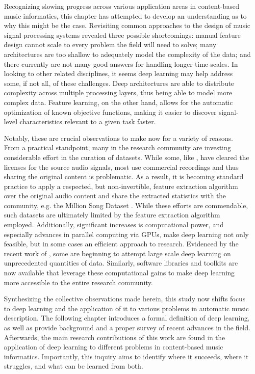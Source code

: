 Recognizing slowing progress across various application areas in content-based music informatics, this chapter has attempted to develop an understanding as to why this might be the case.
Revisiting common approaches to the design of music signal processing systems revealed three possible shortcomings:
manual feature design cannot scale to every problem the field will need to solve;
many architectures are too shallow to adequately model the complexity of the data;
and there currently are not many good answers for handling longer time-scales.
In looking to other related disciplines, it seems deep learning may help address some, if not all, of these challenges.
Deep architectures are able to distribute complexity across multiple processing layers, thus being able to model more complex data.
Feature learning, on the other hand, allows for the automatic optimization of known objective functions, making it easier to discover signal-level characteristics relevant to a given task faster.

Notably, these are crucial observations to make now for a variety of reasons.
From a practical standpoint, many in the research community are investing considerable effort in the curation of datasets.
While some, like \cite{medley}, have cleared the licenses for the source audio signals, most use commercial recordings and thus sharing the original content is problematic.
As a result, it is becoming standard practice to apply a respected, but non-invertible, feature extraction algorithm over the original audio content and share the extracted statistics with the community, e.g. the Million Song Dataset \cite{BertinMahieux2014}.
While these efforts are commendable, such datasets are ultimately limited by the feature extraction algorithm employed.
Additionally, significant increases is computational power, and especially advances in parallel computing via GPUs, make deep learning not only feasible, but in some cases an efficient approach to research.
Evidenced by the recent work of \cite{kittehs}, some are beginning to attempt large scale deep learning on unprecedented quantities of data.
Similarly, software libraries and toolkits \cite{Theano, Torch, Caafe} are now available that leverage these computational gains to make deep learning more accessible to the entire research community.

Synthesizing the collective observations made herein, this study now shifts focus to deep learning and the application of it to various problems in automatic music description.
The following chapter introduces a formal definition of deep learning, as well as provide background and a proper survey of recent advances in the field.
Afterwards, the main research contributions of this work are found in the application of deep learning to different problems in content-based music informatics.
Importantly, this inquiry aims to identify where it succeeds, where it struggles, and what can be learned from both.
